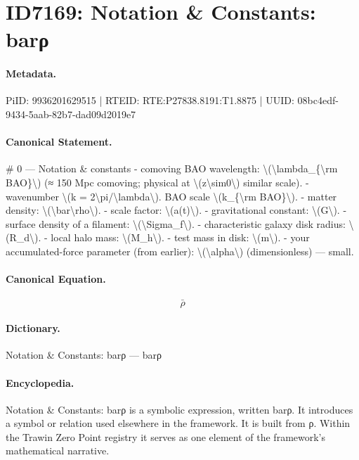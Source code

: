 \section*{ID7169: Notation \& Constants: barρ}
\paragraph{Metadata.}
PiID: 9936201629515 | RTEID: RTE:P27838.8191:T1.8875 | UUID: 08bc4edf-9434-5aab-82b7-dad09d2019e7

\paragraph{Canonical Statement.}
\# 0 — Notation \& constants - comoving BAO wavelength: \textbackslash{}(\textbackslash{}lambda\_\{\textbackslash{}rm BAO\}\textbackslash{}) (≈ 150 Mpc comoving; physical at \textbackslash{}(z\textbackslash{}sim0\textbackslash{}) similar scale). - wavenumber \textbackslash{}(k = 2\textbackslash{}pi/\textbackslash{}lambda\textbackslash{}). BAO scale \textbackslash{}(k\_\{\textbackslash{}rm BAO\}\textbackslash{}). - matter density: \textbackslash{}(\textbackslash{}bar\textbackslash{}rho\textbackslash{}). - scale factor: \textbackslash{}(a(t)\textbackslash{}). - gravitational constant: \textbackslash{}(G\textbackslash{}). - surface density of a filament: \textbackslash{}(\textbackslash{}Sigma\_f\textbackslash{}). - characteristic galaxy disk radius: \textbackslash{}(R\_d\textbackslash{}). - local halo mass: \textbackslash{}(M\_h\textbackslash{}). - test mass in disk: \textbackslash{}(m\textbackslash{}). - your accumulated-force parameter (from earlier): \textbackslash{}(\textbackslash{}alpha\textbackslash{}) (dimensionless) — small.

\paragraph{Canonical Equation.}
\[
\bar\rho
\]

\paragraph{Dictionary.}
Notation \& Constants: barρ — barρ

\paragraph{Encyclopedia.}
Notation \& Constants: barρ is a symbolic expression, written barρ. It introduces a symbol or relation used elsewhere in the framework. It is built from ρ. Within the Trawin Zero Point registry it serves as one element of the framework's mathematical narrative.
